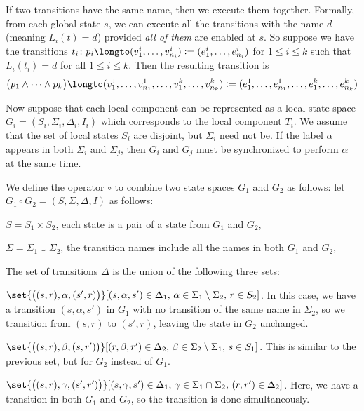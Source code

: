 If two transitions have the same name, then we execute them together.
Formally, from each global state $s$, we can execute all the transitions with the name $d$ (meaning $L_i(t)=d$) provided {\it all of them} are enabled at $s$.
So suppose we have the transitions $t_i\colon p_i\longto(v_1^i,\dots,v_{n_i}^i)\coloneqq(e_1^i,\dots,e_{n_i}^i)$ for $1\leq i\leq k$ such that $L_i(t_i)=d$ for all $1\leq i\leq k$.
Then the resulting transition is
$$ \bigl(p_1\land\cdots\land p_k\bigr)\longto(v_1^1,\dots,v_{n_1}^1,\dots,v_1^k,\dots,v_{n_k}^k)\coloneqq(e_1^1,\dots,e_{n_1}^1,\dots,e_1^k,\dots,e_{n_k}^k) $$

Now suppose that each local component can be represented as a local state space $G_i=(S_i,\Sigma_i,\Delta_i,I_i)$ which corresponds to the local component $T_i$.
We assume that the set of local states $S_i$ are disjoint, but $\Sigma_i$ need not be.
If the label $\alpha$ appears in both $\Sigma_i$ and $\Sigma_j$, then $G_i$ and $G_j$ must be synchronized to perform $\alpha$ at the same time.

We define the operator $\circ$ to combine two state spaces $G_1$ and $G_2$ as follows: let $G_1\circ G_2=(S,\Sigma,\Delta,I)$ as follows:
\benum
    \item $S=S_1\times S_2$, each state is a pair of a state from $G_1$ and $G_2$,
    \item $\Sigma=\Sigma_1\cup\Sigma_2$, the transition names include all the names in both $G_1$ and $G_2$,
    \item The set of transitions $\Delta$ is the union of the following three sets:
        \benum
            \item $\set{\bigl((s,r),\alpha,(s',r)\bigr)}[(s,\alpha,s')\in\Delta_1,\,\alpha\in\Sigma_1\setminus\Sigma_2,\,r\in S_2]$.
                In this case, we have a transition $(s,\alpha,s')$ in $G_1$ with no transition of the same name in $\Sigma_2$, so we transition from $(s,r)$ to $(s',r)$, leaving the state in $G_2$
                unchanged.
            \item $\set{\bigl((s,r),\beta,(s,r')\bigr)}[(r,\beta,r')\in\Delta_2,\,\beta\in\Sigma_2\setminus\Sigma_1,\,s\in S_1]$.
                This is similar to the previous set, but for $G_2$ instead of $G_1$.
            \item $\set{\bigl((s,r),\gamma,(s',r')\bigr)}[(s,\gamma,s')\in\Delta_1,\,\gamma\in\Sigma_1\cap\Sigma_2,\,(r,r')\in\Delta_2]$.
                Here, we have a transition in both $G_1$ and $G_2$, so the transition is done simultaneously.
        \eenum
\eenum

